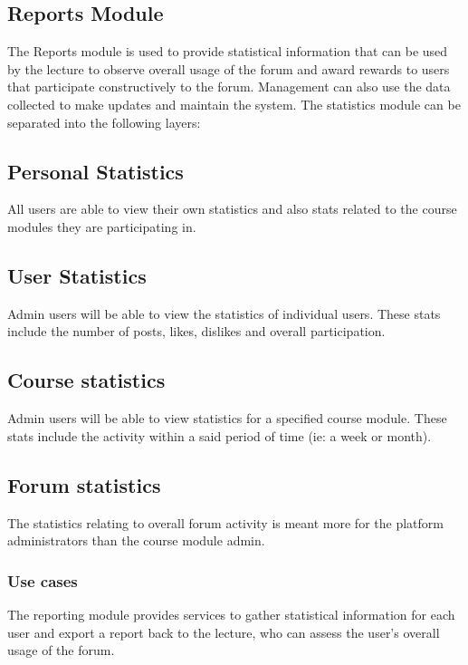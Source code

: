 \subsection{Reports Module}
\par{The Reports module is used to provide statistical information that can be used by the lecture to observe overall usage of the forum and award rewards to users that participate constructively to the forum. Management can also use the data collected to make updates and maintain the system. The statistics module can be separated into the following layers:}

\subsection*{Personal Statistics}
\par{All users are able to view their own statistics and also stats related to the course modules they are participating in.}
\subsection*{User Statistics}
\par{Admin users will be able to view the statistics of individual users. These stats include the number of posts, likes, dislikes and overall participation.}
\subsection*{Course statistics}
\par{Admin users will be able to view statistics for a specified course module. These stats include the activity within a said period of time (ie: a week or month).}
\subsection*{Forum statistics}
\par{The statistics relating to overall forum activity is meant more for the platform administrators than the course module admin.}

\subsubsection{Use cases}
\par{The reporting module provides services to gather statistical information for each user and export a report back to the lecture, who can assess the user’s overall usage of the forum.}

